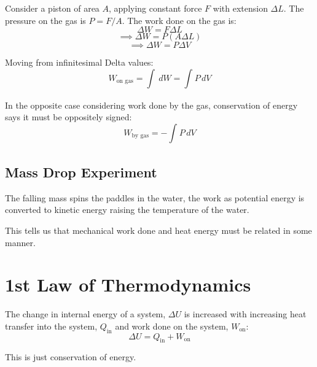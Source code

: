 Consider a piston of area $A$, applying constant force $F$ with extension $\Delta L$. The pressure on the gas is $P = F/A$. The work done on the gas is:
\[
    \Delta W = F \Delta L
\]
\[
    \implies \Delta W = P (A \Delta L)
\]
\[
    \implies \Delta W = P \Delta V
\]

Moving from infinitesimal Delta values:
\[
    W_{\text{on gas}} = \int_{}^{}  \, dW = \int_{}^{} P \, dV
\]

In the opposite case considering work done by the gas, conservation of energy says it must be oppositely signed:
\[
    W_{\text{by gas}} = - \int_{}^{} P \, dV
\]

\subsection{Mass Drop Experiment}
The falling mass spins the paddles in the water, the work as potential energy is converted to kinetic energy raising the temperature of the water. 

This tells us that mechanical work done and heat energy must be related in some manner.

\section{1st Law of Thermodynamics}
The change in internal energy of a system, $\Delta U$ is increased with increasing heat transfer into the system, $Q_\text{in}$ and work done on the system, $W_\text{on}$:
\[
    \Delta U = Q_\text{in} + W_\text{on}
\]

This is just conservation of energy.

